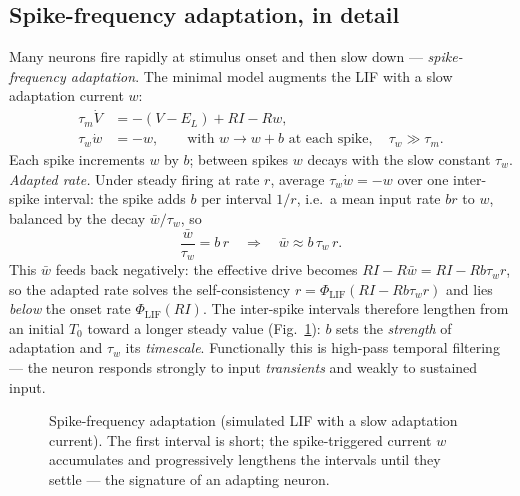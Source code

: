 \documentclass[11pt]{article}
\begin{document}
\subsection{Spike-frequency adaptation, in detail}
Many neurons fire rapidly at stimulus onset and then slow down --- \emph{spike-frequency
adaptation}. The minimal model augments the LIF with a slow adaptation current $w$:
\begin{align}
  \tau_m\dot V &= -(V-E_L)+RI-Rw,\\
  \tau_w\dot w &= -w,\qquad\text{with } w\to w+b \text{ at each spike},\quad \tau_w\gg\tau_m .
\end{align}
Each spike increments $w$ by $b$; between spikes $w$ decays with the slow constant $\tau_w$.
\emph{Adapted rate.} Under steady firing at rate $r$, average $\tau_w\dot w=-w$ over one inter-spike
interval: the spike adds $b$ per interval $1/r$, i.e.\ a mean input rate $br$ to $w$, balanced by the
decay $\bar w/\tau_w$, so
\begin{equation}
  \frac{\bar w}{\tau_w}=b\,r\quad\Longrightarrow\quad \bar w\approx b\,\tau_w\,r .
\end{equation}
This $\bar w$ feeds back negatively: the effective drive becomes $RI-R\bar w=RI-Rb\tau_w r$, so the
adapted rate solves the self-consistency $r=\Phi_{\mathrm{LIF}}(RI-Rb\tau_w r)$ and lies
\emph{below} the onset rate $\Phi_{\mathrm{LIF}}(RI)$. The inter-spike intervals therefore lengthen
from an initial $T_0$ toward a longer steady value (Fig.~\ref{fig:adapt}): $b$ sets the
\emph{strength} of adaptation and $\tau_w$ its \emph{timescale}. Functionally this is high-pass
temporal filtering --- the neuron responds strongly to input \emph{transients} and weakly to
sustained input.

\begin{figure}[h]
\centering
{}
\caption{Spike-frequency adaptation (simulated LIF with a slow adaptation current). The first
interval is short; the spike-triggered current $w$ accumulates and progressively lengthens the
intervals until they settle --- the signature of an adapting neuron.}
\label{fig:adapt}
\end{figure}
\end{document}
